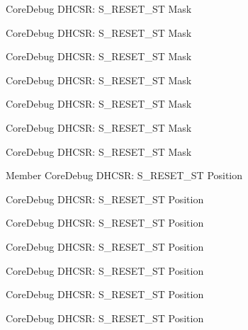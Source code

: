 \begin{DoxyRefList}
\label{deprecated__deprecated000382}%
%
Core\+Debug DHCSR\+: S\+\_\+\+RESET\+\_\+\+ST Mask 

\label{deprecated__deprecated000164}%
%
Core\+Debug DHCSR\+: S\+\_\+\+RESET\+\_\+\+ST Mask 

\label{deprecated__deprecated000461}%
%
Core\+Debug DHCSR\+: S\+\_\+\+RESET\+\_\+\+ST Mask 

\label{deprecated__deprecated000010}%
%
Core\+Debug DHCSR\+: S\+\_\+\+RESET\+\_\+\+ST Mask 

\label{deprecated__deprecated000306}%
%
Core\+Debug DHCSR\+: S\+\_\+\+RESET\+\_\+\+ST Mask 

\label{deprecated__deprecated000249}%
%
Core\+Debug DHCSR\+: S\+\_\+\+RESET\+\_\+\+ST Mask 

\label{deprecated__deprecated000110}%
%
Core\+Debug DHCSR\+: S\+\_\+\+RESET\+\_\+\+ST Mask  
\item[Member \doxylink{group__CMSIS__CoreDebug_ga6f934c5427ea057394268e541fa97753}{Core\+Debug\+\_\+\+DHCSR\+\_\+\+S\+\_\+\+RESET\+\_\+\+ST\+\_\+\+Pos} ]\label{deprecated__deprecated000562}%
%
Core\+Debug DHCSR\+: S\+\_\+\+RESET\+\_\+\+ST Position 

\label{deprecated__deprecated000305}%
%
Core\+Debug DHCSR\+: S\+\_\+\+RESET\+\_\+\+ST Position 

\label{deprecated__deprecated000460}%
%
Core\+Debug DHCSR\+: S\+\_\+\+RESET\+\_\+\+ST Position 

\label{deprecated__deprecated000163}%
%
Core\+Debug DHCSR\+: S\+\_\+\+RESET\+\_\+\+ST Position 

\label{deprecated__deprecated000009}%
%
Core\+Debug DHCSR\+: S\+\_\+\+RESET\+\_\+\+ST Position 

\label{deprecated__deprecated000381}%
%
Core\+Debug DHCSR\+: S\+\_\+\+RESET\+\_\+\+ST Position 

\label{deprecated__deprecated000248}%
%
Core\+Debug DHCSR\+: S\+\_\+\+RESET\+\_\+\+ST Position 


\end{DoxyRefList}
